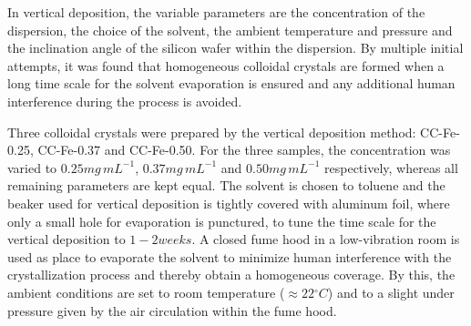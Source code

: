 \documentclass[\main/dresen_thesis.tex]{subfiles}
\begin{document}
  \label{sec:colloidalCrystals:layers:preparation}
  In vertical deposition, the variable parameters are the concentration of the dispersion, the choice of the solvent, the ambient temperature and pressure and the inclination angle of the silicon wafer within the dispersion.
  By multiple initial attempts, it was found that homogeneous colloidal crystals are formed when a long time scale for the solvent evaporation is ensured and any additional human interference during the process is avoided.

  Three colloidal crystals were prepared by the vertical deposition method: CC-Fe-0.25, CC-Fe-0.37 and CC-Fe-0.50.
  For the three samples, the concentration was varied to $0.25 mg \, mL^{-1}$, $0.37 mg \, mL^{-1}$ and $0.50 mg \, mL^{-1}$ respectively, whereas all remaining parameters are kept equal.
  The solvent is chosen to toluene and the beaker used for vertical deposition is tightly covered with aluminum foil, where only a small hole for evaporation is punctured, to tune the time scale for the vertical deposition to $1 - 2 \unit{weeks}$.
  A closed fume hood in a low-vibration room is used as place to evaporate the solvent to minimize human interference with the crystallization process and thereby obtain a homogeneous coverage.
  By this, the ambient conditions are set to room temperature ($\approx 22\unit{^\circ C}$) and to a slight under pressure given by the air circulation within the fume hood.
\end{document}
